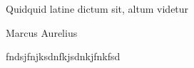 \epigraph{Quidquid latine dictum sit, altum videtur}{Marcus Aurelius}
\lipsum
fndsjfnjksdnfkjsdnkjfnkfsd